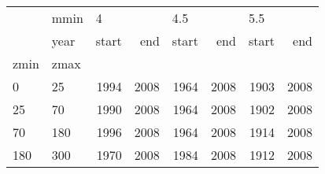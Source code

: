 \begin{tabular}{llrrrrrr}
\toprule
    & mmin & \multicolumn{2}{l}{4} & \multicolumn{2}{l}{4.5} & \multicolumn{2}{l}{5.5} \\
    & year & start &   end & start &   end & start &   end \\
zmin & zmax &       &       &       &       &       &       \\
\midrule
0   & 25  &  1994 &  2008 &  1964 &  2008 &  1903 &  2008 \\
25  & 70  &  1990 &  2008 &  1964 &  2008 &  1902 &  2008 \\
70  & 180 &  1996 &  2008 &  1964 &  2008 &  1914 &  2008 \\
180 & 300 &  1970 &  2008 &  1984 &  2008 &  1912 &  2008 \\
\bottomrule
\end{tabular}
